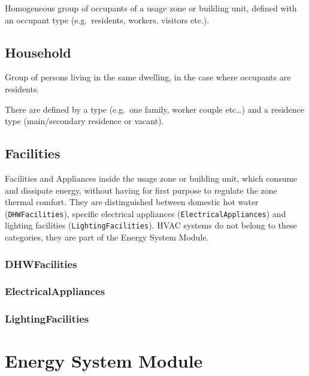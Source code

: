\documentclass[a4paper,12pt]{article}
\let\stdsection\section%
\renewcommand\section{\newpage\stdsection}
\begin{document}
Homogeneous group of occupants of a usage zone or building unit, defined
with an occupant type (e.g.~residents, workers, visitors etc.).

\subsection{Household}\label{household}

Group of persons living in the same dwelling, in the case where
occupants are residents.

There are defined by a type (e.g.~one family, worker couple etc\ldots{})
and a residence type (main/secondary residence or vacant).

\subsection{Facilities}\label{facilities}

Facilities and Appliances inside the usage zone or building unit, which
consume and dissipate energy, without having for first purpose to
regulate the zone thermal comfort. They are distinguished between
domestic hot water (\texttt{DHWFacilities}), specific electrical
appliances (\texttt{ElectricalAppliances}) and lighting facilities
(\texttt{LightingFacilities}). HVAC systems do not belong to these
categories, they are part of the Energy System Module.

\subsubsection{DHWFacilities}\label{dhwfacilities}

\subsubsection{ElectricalAppliances}\label{electricalappliances}

\subsubsection{LightingFacilities}\label{lightingfacilities}

\section{Energy System Module}\label{energy-system-module}
\end{document}
